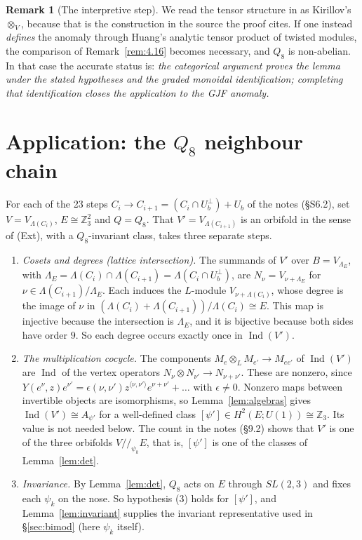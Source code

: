 \documentclass[11pt]{article}
\theoremstyle{definition}
\newtheorem{remark}[theorem]{Remark}
\newcommand{\Ind}{\operatorname{Ind}}
\newcommand{\Z}{\mathbb Z}
\begin{document}
\begin{remark}[The interpretive step]\label{rem:reading}
We read the tensor structure in \cite[Thm~4.2]{GJF} as Kirillov's $\otimes_V$, because that is
the construction in the source the proof cites. If one instead \emph{defines} the anomaly through
Huang's analytic tensor product of twisted modules, the comparison of
Remark~\ref{rem:4.16} becomes necessary, and $Q_8$ is non-abelian. In that case the accurate
status is: \emph{the categorical argument proves the lemma under the stated hypotheses and the
graded monoidal identification; completing that identification closes the application to the GJF
anomaly.}
\end{remark}

\section{Application: the $Q_8$ neighbour chain}\label{sec:app}
For each of the 23 steps $C_i\to C_{i+1}=(C_i\cap U_b^\perp)+U_b$ of the notes (\S S6.2), set
$V=V_{\Lambda(C_i)}$, $E\cong\Z_3^2$ and $Q=Q_8$. That $V'=V_{\Lambda(C_{i+1})}$ is an orbifold in the
sense of (Ext), with a $Q_8$-invariant class, takes three separate steps.
\begin{enumerate}[label=(A\arabic*),nosep]
\item \emph{Cosets and degrees (lattice intersection).} The summands of $V'$ over
$B=V_{\Lambda_E}$, with $\Lambda_E=\Lambda(C_i)\cap\Lambda(C_{i+1})=\Lambda(C_i\cap U_b^\perp)$, are
$N_\nu=V_{\nu+\Lambda_E}$ for $\nu\in\Lambda(C_{i+1})/\Lambda_E$. Each induces the $L$-module
$V_{\nu+\Lambda(C_i)}$, whose degree is the image of $\nu$ in
$(\Lambda(C_i)+\Lambda(C_{i+1}))/\Lambda(C_i)\cong E$. This map is injective because the
intersection is $\Lambda_E$, and it is bijective because both sides have order $9$. So each degree
occurs exactly once in $\Ind(V')$.
\item \emph{The multiplication cocycle.} The components $M_e\otimes_LM_{e'}\to M_{ee'}$ of
$\Ind(V')$ are $\Ind$ of the vertex operators $N_\nu\otimes N_{\nu'}\to N_{\nu+\nu'}$. These are
nonzero, since $Y(e^{\nu},z)e^{\nu'}=\epsilon(\nu,\nu')z^{\langle\nu,\nu'\rangle}e^{\nu+\nu'}+\dots$ with
$\epsilon\ne0$. Nonzero maps between invertible objects are isomorphisms, so
Lemma~\ref{lem:algebras} gives $\Ind(V')\cong A_{\psi'}$ for a well-defined class
$[\psi']\in H^2(E;U(1))\cong\Z_3$. Its value is not needed below. The count in the notes (\S9.2)
shows that $V'$ is one of the three orbifolds $V/\!/_{\psi_k}E$, that is, $[\psi']$ is one of the
classes of Lemma~\ref{lem:det}.
\item \emph{Invariance.} By Lemma~\ref{lem:det}, $Q_8$ acts on $E$ through $SL(2,3)$ and fixes
each $\psi_k$ on the nose. So hypothesis (3) holds for $[\psi']$, and Lemma~\ref{lem:invariant}
supplies the invariant representative used in \S\ref{sec:bimod} (here $\psi_k$ itself).
\end{enumerate}
\end{document}
